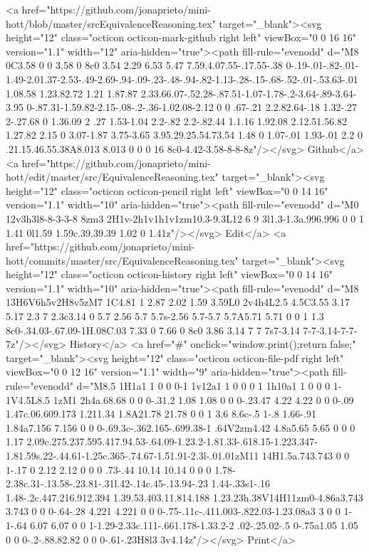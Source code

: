       <a href="https://github.com/jonaprieto/mini-hott/blob/master/srcEquivalenceReasoning.tex" target="_blank"><svg height="12" class="octicon octicon-mark-github right left" viewBox="0 0 16 16" version="1.1" width="12" aria-hidden="true"><path fill-rule="evenodd" d="M8 0C3.58 0 0 3.58 0 8c0 3.54 2.29 6.53 5.47 7.59.4.07.55-.17.55-.38 0-.19-.01-.82-.01-1.49-2.01.37-2.53-.49-2.69-.94-.09-.23-.48-.94-.82-1.13-.28-.15-.68-.52-.01-.53.63-.01 1.08.58 1.23.82.72 1.21 1.87.87 2.33.66.07-.52.28-.87.51-1.07-1.78-.2-3.64-.89-3.64-3.95 0-.87.31-1.59.82-2.15-.08-.2-.36-1.02.08-2.12 0 0 .67-.21 2.2.82.64-.18 1.32-.27 2-.27.68 0 1.36.09 2 .27 1.53-1.04 2.2-.82 2.2-.82.44 1.1.16 1.92.08 2.12.51.56.82 1.27.82 2.15 0 3.07-1.87 3.75-3.65 3.95.29.25.54.73.54 1.48 0 1.07-.01 1.93-.01 2.2 0 .21.15.46.55.38A8.013 8.013 0 0 0 16 8c0-4.42-3.58-8-8-8z"/></svg> Github</a>
      <a href="https://github.com/jonaprieto/mini-hott/edit/master/src/EquivalenceReasoning.tex" target="_blank"><svg height="12" class="octicon octicon-pencil right left" viewBox="0 0 14 16" version="1.1" width="10" aria-hidden="true"><path fill-rule="evenodd" d="M0 12v3h3l8-8-3-3-8 8zm3 2H1v-2h1v1h1v1zm10.3-9.3L12 6 9 3l1.3-1.3a.996.996 0 0 1 1.41 0l1.59 1.59c.39.39.39 1.02 0 1.41z"/></svg> Edit</a>
      <a href="https://github.com/jonaprieto/mini-hott/commits/master/src/EquivalenceReasoning.tex" target="_blank"><svg height="12" class="octicon octicon-history right left" viewBox="0 0 14 16" version="1.1" width="10" aria-hidden="true"><path fill-rule="evenodd" d="M8 13H6V6h5v2H8v5zM7 1C4.81 1 2.87 2.02 1.59 3.59L0 2v4h4L2.5 4.5C3.55 3.17 5.17 2.3 7 2.3c3.14 0 5.7 2.56 5.7 5.7s-2.56 5.7-5.7 5.7A5.71 5.71 0 0 1 1.3 8c0-.34.03-.67.09-1H.08C.03 7.33 0 7.66 0 8c0 3.86 3.14 7 7 7s7-3.14 7-7-3.14-7-7-7z"/></svg> History</a>
      <a  href="#" onclick="window.print();return false;" target="_blank"><svg height="12" class="octicon octicon-file-pdf right left" viewBox="0 0 12 16" version="1.1" width="9" aria-hidden="true"><path fill-rule="evenodd" d="M8.5 1H1a1 1 0 0 0-1 1v12a1 1 0 0 0 1 1h10a1 1 0 0 0 1-1V4.5L8.5 1zM1 2h4a.68.68 0 0 0-.31.2 1.08 1.08 0 0 0-.23.47 4.22 4.22 0 0 0-.09 1.47c.06.609.173 1.211.34 1.8A21.78 21.78 0 0 1 3.6 8.6c-.5 1-.8 1.66-.91 1.84a7.156 7.156 0 0 0-.69.3c-.362.165-.699.38-1 .64V2zm4.42 4.8a5.65 5.65 0 0 0 1.17 2.09c.275.237.595.417.94.53-.64.09-1.23.2-1.81.33-.618.15-1.223.347-1.81.59s.22-.44.61-1.25c.365-.74.67-1.51.91-2.3l-.01.01zM11 14H1.5a.743.743 0 0 1-.17 0 2.12 2.12 0 0 0 .73-.44 10.14 10.14 0 0 0 1.78-2.38c.31-.13.58-.23.81-.31l.42-.14c.45-.13.94-.23 1.44-.33s1-.16 1.48-.2c.447.216.912.394 1.39.53.403.11.814.188 1.23.23h.38V14H11zm0-4.86a3.743 3.743 0 0 0-.64-.28 4.221 4.221 0 0 0-.75-.11c-.411.003-.822.03-1.23.08a3 3 0 0 1-1-.64 6.07 6.07 0 0 1-1.29-2.33c.111-.661.178-1.33.2-2 .02-.25.02-.5 0-.75a1.05 1.05 0 0 0-.2-.88.82.82 0 0 0-.61-.23H8l3 3v4.14z"/></svg> Print</a>
